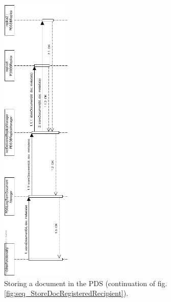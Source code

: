 \documentclass[a4paper,10pt]{article}
\begin{document}
\begin{figure}[!htp]
    \centering
    \includegraphics[width=0.3\textwidth]{Seq_StoreDocPDS.png}
    \caption{Storing a document in the PDS (continuation of fig. \ref{fig:seq_StoreDocRegisteredRecipient}).
        }\label{fig:seq_StoreDocPDS}
\end{figure}
\end{document}
